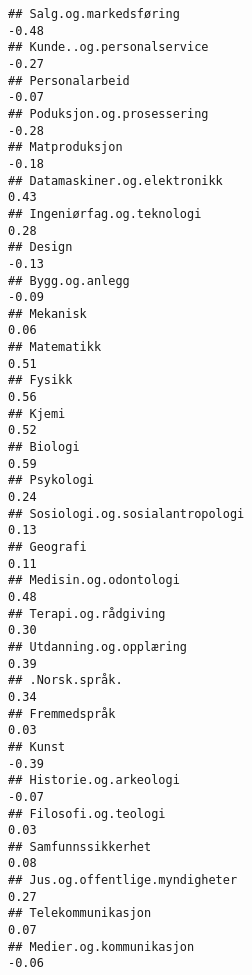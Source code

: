 \documentclass[
]{article}
\begin{document}
\begin{verbatim}
## Salg.og.markedsføring                                                            -0.48
## Kunde..og.personalservice                                                        -0.27
## Personalarbeid                                                                   -0.07
## Poduksjon.og.prosessering                                                        -0.28
## Matproduksjon                                                                    -0.18
## Datamaskiner.og.elektronikk                                                       0.43
## Ingeniørfag.og.teknologi                                                          0.28
## Design                                                                           -0.13
## Bygg.og.anlegg                                                                   -0.09
## Mekanisk                                                                          0.06
## Matematikk                                                                        0.51
## Fysikk                                                                            0.56
## Kjemi                                                                             0.52
## Biologi                                                                           0.59
## Psykologi                                                                         0.24
## Sosiologi.og.sosialantropologi                                                    0.13
## Geografi                                                                          0.11
## Medisin.og.odontologi                                                             0.48
## Terapi.og.rådgiving                                                               0.30
## Utdanning.og.opplæring                                                            0.39
## .Norsk.språk.                                                                     0.34
## Fremmedspråk                                                                      0.03
## Kunst                                                                            -0.39
## Historie.og.arkeologi                                                            -0.07
## Filosofi.og.teologi                                                               0.03
## Samfunnssikkerhet                                                                 0.08
## Jus.og.offentlige.myndigheter                                                     0.27
## Telekommunikasjon                                                                 0.07
## Medier.og.kommunikasjon                                                          -0.06

\end{verbatim}
\end{document}
